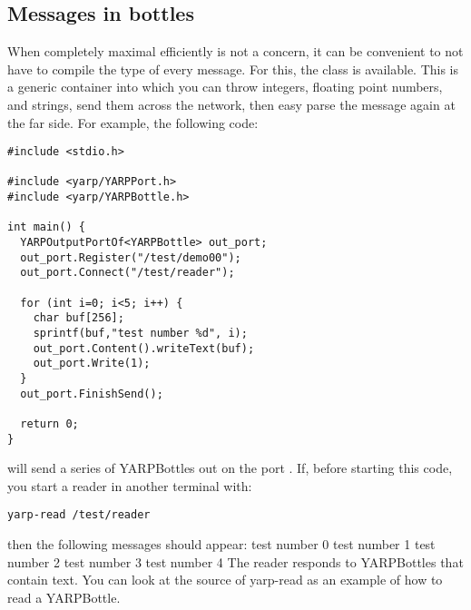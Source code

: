 







\subsection{Messages in bottles}

When completely maximal efficiently is not a concern, it can be 
convenient to not have to compile the type of every message.
For this, the  class is available.  This is a generic
container into which you can throw integers, floating point numbers,
and strings, send them across the network, then easy parse the message
again at the far side.  For example, the following code:
%
\begin{verbatim}
#include <stdio.h>

#include <yarp/YARPPort.h>
#include <yarp/YARPBottle.h>

int main() {
  YARPOutputPortOf<YARPBottle> out_port;
  out_port.Register("/test/demo00");
  out_port.Connect("/test/reader");

  for (int i=0; i<5; i++) {
    char buf[256];
    sprintf(buf,"test number %d", i);
    out_port.Content().writeText(buf);
    out_port.Write(1);
  }
  out_port.FinishSend();

  return 0;
}
\end{verbatim}
%
will send a series of YARPBottles out on the port .
If, before starting this code, you start a reader in another terminal with:
%
\begin{verbatim}
yarp-read /test/reader
\end{verbatim}
%
then the following messages should appear:
%
test number 0
test number 1
test number 2
test number 3
test number 4
%
The  reader responds to YARPBottles that contain text.
You can look at the source of yarp-read as an example of how to read 
a YARPBottle.

